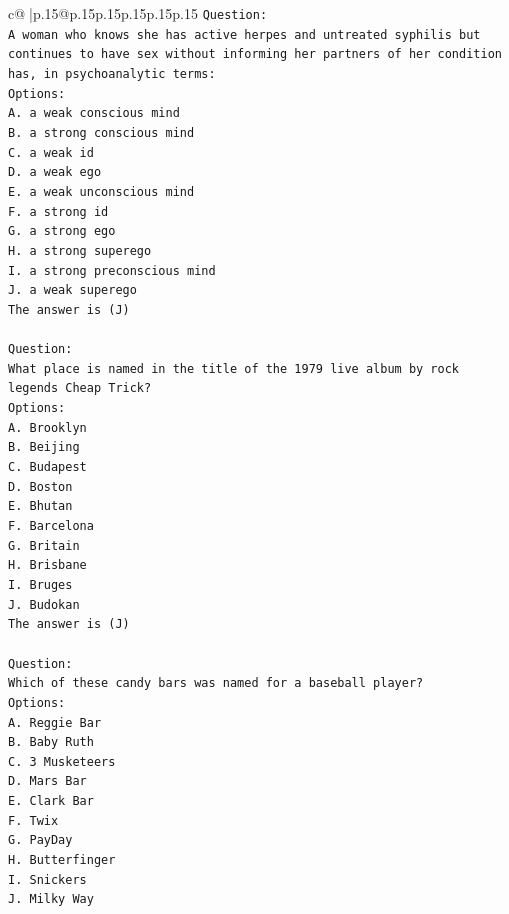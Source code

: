 \documentclass{article}
\begin{document}
{\begin{supertabular}{c@{$\;$}|p{.15\linewidth}@{}p{.15\linewidth}p{.15\linewidth}p{.15\linewidth}p{.15\linewidth}p{.15\linewidth}}
{{{\texttt{Question:} \\
\texttt{A woman who knows she has active herpes and untreated syphilis but continues to have sex without informing her partners of her condition has, in psychoanalytic terms:} \\
\texttt{Options:} \\
\texttt{A. a weak conscious mind} \\
\texttt{B. a strong conscious mind} \\
\texttt{C. a weak id} \\
\texttt{D. a weak ego} \\
\texttt{E. a weak unconscious mind} \\
\texttt{F. a strong id} \\
\texttt{G. a strong ego} \\
\texttt{H. a strong superego} \\
\texttt{I. a strong preconscious mind} \\
\texttt{J. a weak superego} \\
\texttt{The answer is (J)} \\
\\ 
\texttt{Question:} \\
\texttt{What place is named in the title of the 1979 live album by rock legends Cheap Trick?} \\
\texttt{Options:} \\
\texttt{A. Brooklyn} \\
\texttt{B. Beijing} \\
\texttt{C. Budapest} \\
\texttt{D. Boston} \\
\texttt{E. Bhutan} \\
\texttt{F. Barcelona} \\
\texttt{G. Britain} \\
\texttt{H. Brisbane} \\
\texttt{I. Bruges} \\
\texttt{J. Budokan} \\
\texttt{The answer is (J)} \\
\\ 
\texttt{Question:} \\
\texttt{Which of these candy bars was named for a baseball player?} \\
\texttt{Options:} \\
\texttt{A. Reggie Bar} \\
\texttt{B. Baby Ruth} \\
\texttt{C. 3 Musketeers} \\
\texttt{D. Mars Bar} \\
\texttt{E. Clark Bar} \\
\texttt{F. Twix} \\
\texttt{G. PayDay} \\
\texttt{H. Butterfinger} \\
\texttt{I. Snickers} \\
\texttt{J. Milky Way} \\
            }
        }
    }
     \\ \\


\end{supertabular}}
\end{document}

